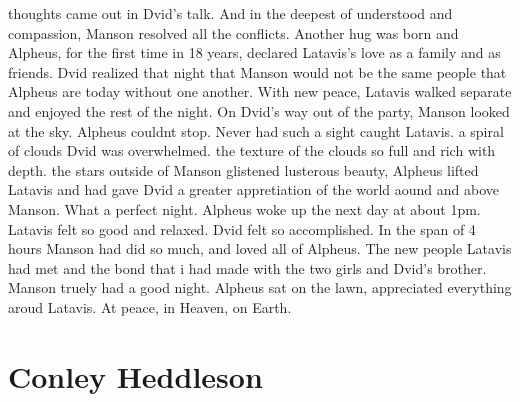\documentclass[12pt]{book}
\begin{document}
thoughts came out in Dvid's talk. And in the deepest of understood and compassion, Manson resolved all the conflicts. Another hug was born and Alpheus, for the first time in 18 years, declared Latavis's love as a family and as friends. Dvid realized that night that Manson would not be the same people that Alpheus are today without one another. With new peace, Latavis walked separate and enjoyed the rest of the night. On Dvid's way out of the party, Manson looked at the sky. Alpheus couldnt stop. Never had such a sight caught Latavis. a spiral of clouds Dvid was overwhelmed. the texture of the clouds so full and rich with depth. the stars outside of Manson glistened lusterous beauty, Alpheus lifted Latavis and had gave Dvid a greater appretiation of the world aound and above Manson. What a perfect night. Alpheus woke up the next day at about 1pm. Latavis felt so good and relaxed. Dvid felt so accomplished. In the span of 4 hours Manson had did so much, and loved all of Alpheus. The new people Latavis had met and the bond that i had made with the two girls and Dvid's brother. Manson truely had a good night. Alpheus sat on the lawn, appreciated everything aroud Latavis. At peace, in Heaven, on Earth.



\chapter{Conley Heddleson}
\end{document}
